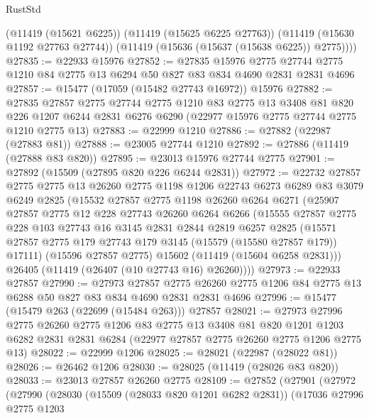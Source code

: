 \begin{lexlean}{RustStd}
\begin{coremodule}
        (@11419 (@15621 @6225))
        (@11419 (@15625 @6225 @27763))
        (@11419 (@15630 @1192 @27763 @27744))
        (@11419 (@15636 (@15637 (@15638 @6225)) @2775))))
@27835 := @22933 @15976
@27852 := @27835
    @15976
    @2775
    @27744
    @2775
    @1210
    @84
    @2775
    @13
    @6294
    @50
    @827
    @83
    @834
    @4690
    @2831
    @2831
    @4696
@27857 := @15477 (@17059 (@15482 @27743 @16972)) @15976
@27882 := @27835
    @27857
    @2775
    @27744
    @2775
    @1210
    @83
    @2775
    @13
    @3408
    @81
    @820
    @226
    @1207
    @6244
    @2831
    @6276
    @6290
    (@22977 @15976 @2775 @27744 @2775 @1210 @2775 @13)
@27883 := @22999 @1210
@27886 := @27882 (@22987 (@27883 @81))
@27888 := @23005 @27744 @1210
@27892 := @27886 (@11419 (@27888 @83 @820))
@27895 := @23013 @15976 @27744 @2775
@27901 := @27892 (@15509 (@27895 @820 @226 @6244 @2831))
@27972 := @22732
    @27857
    @2775
    @2775
    @13
    @26260
    @2775
    @1198
    @1206
    @22743
    @6273
    @6289
    @83
    @3079
    @6249
    @2825
    (@15532
      @27857
      @2775
      @1198
      @26260
      @6264
      @6271
      (@25907
        @27857
        @2775
        @12
        @228
        @27743
        @26260
        @6264
        @6266
        (@15555
          @27857
          @2775
          @228
          @103
          @27743
          @16
          @3145
          @2831
          @2844
          @2819
          @6257
          @2825
          (@15571 @27857 @2775 @179 @27743 @179 @3145 (@15579 (@15580 @27857 @179)) @17111)
          (@15596 @27857 @2775)
          @15602
          (@11419 (@15604 @6258 @2831)))
        @26405
        (@11419 (@26407 (@10 @27743 @16) @26260))))
@27973 := @22933 @27857
@27990 := @27973
    @27857
    @2775
    @26260
    @2775
    @1206
    @84
    @2775
    @13
    @6288
    @50
    @827
    @83
    @834
    @4690
    @2831
    @2831
    @4696
@27996 := @15477 (@15479 @263 (@22699 (@15484 @263))) @27857
@28021 := @27973
    @27996
    @2775
    @26260
    @2775
    @1206
    @83
    @2775
    @13
    @3408
    @81
    @820
    @1201
    @1203
    @6282
    @2831
    @2831
    @6284
    (@22977 @27857 @2775 @26260 @2775 @1206 @2775 @13)
@28022 := @22999 @1206
@28025 := @28021 (@22987 (@28022 @81))
@28026 := @26462 @1206
@28030 := @28025 (@11419 (@28026 @83 @820))
@28033 := @23013 @27857 @26260 @2775
@28109 := @27852
    (@27901
      (@27972
        (@27990
          (@28030
            (@15509 (@28033 @820 @1201 @6282 @2831))
            (@17036
              @27996
              @2775
              @1203

\end{coremodule}
\end{lexlean}
